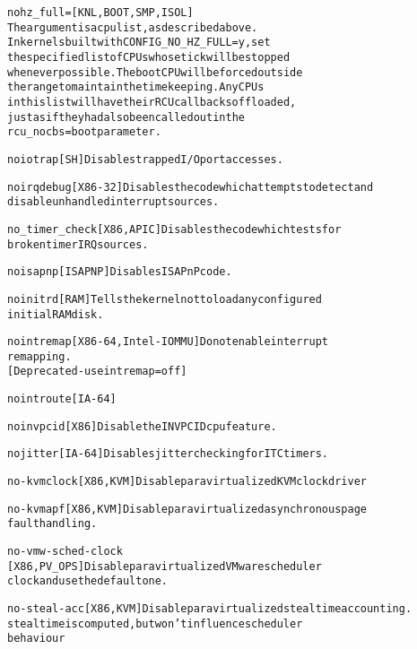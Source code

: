 \documentclass[a4paper,8pt,english]{sphinxmanual}
\begin{document}
\begin{alltt}
        nohz\_full=      {[}KNL,BOOT,SMP,ISOL{]}
                        The argument is a cpu list, as described above.
                        In kernels built with CONFIG\_NO\_HZ\_FULL=y, set
                        the specified list of CPUs whose tick will be stopped
                        whenever possible. The boot CPU will be forced outside
                        the range to maintain the timekeeping.  Any CPUs
                        in this list will have their RCU callbacks offloaded,
                        just as if they had also been called out in the
                        rcu\_nocbs= boot parameter.

        noiotrap        {[}SH{]} Disables trapped I/O port accesses.

        noirqdebug      {[}X86-32{]} Disables the code which attempts to detect and
                        disable unhandled interrupt sources.

        no\_timer\_check  {[}X86,APIC{]} Disables the code which tests for
                        broken timer IRQ sources.

        noisapnp        {[}ISAPNP{]} Disables ISA PnP code.

        noinitrd        {[}RAM{]} Tells the kernel not to load any configured
                        initial RAM disk.

        nointremap      {[}X86-64, Intel-IOMMU{]} Do not enable interrupt
                        remapping.
                        {[}Deprecated - use intremap=off{]}

        nointroute      {[}IA-64{]}

        noinvpcid       {[}X86{]} Disable the INVPCID cpu feature.

        nojitter        {[}IA-64{]} Disables jitter checking for ITC timers.

        no-kvmclock     {[}X86,KVM{]} Disable paravirtualized KVM clock driver

        no-kvmapf       {[}X86,KVM{]} Disable paravirtualized asynchronous page
                        fault handling.

        no-vmw-sched-clock
                        {[}X86,PV\_OPS{]} Disable paravirtualized VMware scheduler
                        clock and use the default one.

        no-steal-acc    {[}X86,KVM{]} Disable paravirtualized steal time accounting.
                        steal time is computed, but won't influence scheduler
                        behaviour


\end{alltt}
\end{document}
